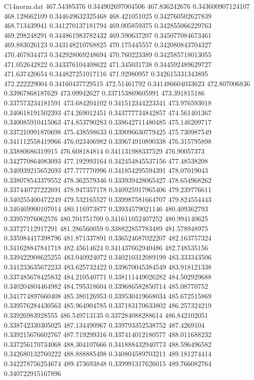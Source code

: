\begin{filecontents}{C14norm.dat}
467.54385376			0.344902697004506
467.836242676			0.343600907124107
468.128662109			0.344649632325468
468.421051025			0.342760502627839
468.713439941			0.341270137181794
469.005859375			0.342855066229763
469.298248291			0.344861983782432
469.590637207			0.345077084673461
469.883026123			0.343148210768825
470.175445557			0.342080843704327
470.467834473			0.342928069248694
470.760223389			0.342585718013055
471.052642822			0.343376104408622
471.345031738			0.344592489629727
471.637420654			0.344827251017116
471.92980957			0.342615331343895
472.222229004			0.34160437729515
472.51461792			0.341486604033623
472.807006836			0.33967868187629
473.09942627			0.337153869605991
473.391815186			0.337573234181591
473.684204102			0.341512344223341
473.976593018			0.340618191502393
474.269012451			0.343777734842857
474.561401367			0.340085910415063
474.853790283			0.338642711480485
475.146209717			0.337210991870698
475.438598633			0.339096630779425
475.730987549			0.341112558419966
476.023406982			0.339674910890338
476.315795898			0.33880686319915
476.608184814			0.341131988337529
476.90057373			0.342770864083093
477.192993164			0.342454845537156
477.48538208			0.340939215652693
477.777770996			0.341854295594391
478.07019043			0.338078543379552
478.362579346			0.333939428065427
478.654968262			0.337440727222691
478.947357178			0.340925917965406
479.239776611			0.340255400472249
479.532165527			0.339987581664707
479.824554443			0.340469900107014
480.116973877			0.33934579021146
480.409362793			0.33957976062576
480.701751709			0.341611052407252
480.994140625			0.33727112917291
481.286560059			0.338822857783489
481.578948975			0.335984417398796
481.871337891			0.336524687022207
482.163757324			0.341628847841718
482.45614624			0.341437662940486
482.748535156			0.339422908625255
483.040924072			0.340210312089199
483.333343506			0.341233635672233
483.625732422			0.339670045384549
483.918121338			0.337485678425832
484.210540771			0.338111449026282
484.502929688			0.340204804464982
484.795318604			0.339686582850714
485.08770752			0.341774897660408
485.380126953			0.339530419668034
485.672515869			0.339576284430563
485.964904785			0.337183170633802
486.257324219			0.33926983928555
486.549713135			0.337284088288614
486.842102051			0.338742330305025
487.134490967			0.339793352538752
487.4269104			0.339215676602767
487.719299316			0.337414012180577
488.011688232			0.337256170734068
488.304107666			0.341888432940773
488.596496582			0.342680132760222
488.888885498			0.340804589703211
489.181274414			0.342278756254674
489.473693848			0.339991317626015
489.766082764			0.340722915167896

\end{filecontents}
